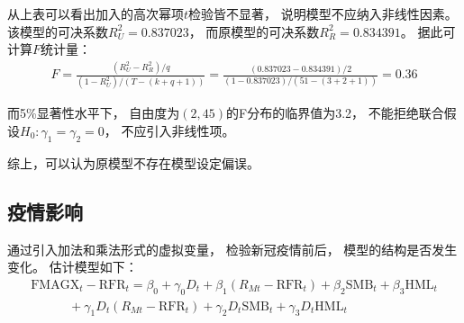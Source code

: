 \documentclass[UTF8]{ctexart}
\begin{document}

从上表可以看出加入的高次幂项$t$检验皆不显著，
说明模型不应纳入非线性因素。
该模型的可决系数$R^2_{U}=0.837023$，
而原模型的可决系数$R^2_{R}=0.834391$。
据此可计算$F$统计量：
\begin{eqnarray}
  F=\frac{\left( R_{U}^{2}-R_{R}^{2} \right) /q}{\left( 1-R_{U}^{2} \right) /(T-(k+q+1))}=\frac{\left( 0.837023-0.834391 \right) /2}{\left( 1-0.837023 \right) /\left( 51-\left( 3+2+1 \right) \right)}=0.36
\end{eqnarray}

而5\%显著性水平下，
自由度为$(2,45)$的F分布的临界值为3.2，
不能拒绝联合假设$H_0:\gamma_1=\gamma_2=0$，
不应引入非线性项。

综上，可以认为原模型不存在模型设定偏误。




\subsection{疫情影响}

通过引入加法和乘法形式的虚拟变量，
检验新冠疫情前后，
模型的结构是否发生变化。
估计模型如下：
\begin{equation}
  \begin{matrix}
    \mathrm{FMAGX}_t-\mathrm{RFR}_t=\beta _0+\gamma _0D_t+\beta _1\left( R_{Mt}-\mathrm{RFR}_t \right) +\beta _2\mathrm{SMB}_t+\beta _3\mathrm{HML}_t \\
    \quad\quad\quad+\gamma _1D_t\left( R_{Mt}-\mathrm{RFR}_t \right) +\gamma _2D_t\mathrm{SMB}_t+\gamma _3D_t\mathrm{HML}_t                           \\
  \end{matrix}
\end{equation}
\end{document}
